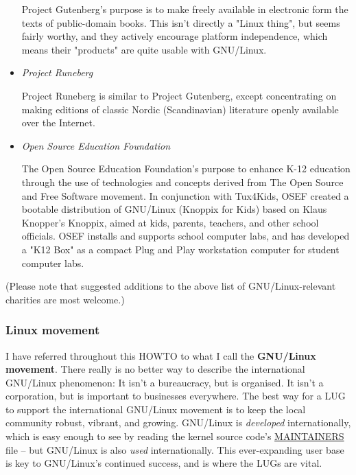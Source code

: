 \begin{itemize}
Project Gutenberg's purpose is to make freely available in electronic
form the texts of public-domain books.  This isn't directly a "Linux
thing", but seems fairly worthy, and they actively encourage platform
independence, which means their "products" are quite usable with GNU/Linux.



\item  
\emph{Project Runeberg} \texttt{\adsurl}
 
Project Runeberg is similar to Project Gutenberg, except concentrating
on making editions of classic Nordic (Scandinavian) literature openly
available over the Internet.





\item  
\emph{Open Source Education Foundation} \texttt{\adturl}
 
The Open Source Education Foundation's purpose to enhance K-12 education
through the use of technologies and concepts derived from The Open
Source and Free Software movement.  In conjunction with Tux4Kids, OSEF 
created a bootable distribution of GNU/Linux (Knoppix for Kids) based 
on Klaus Knopper's Knoppix, aimed at kids, parents, teachers, and 
other school officials. OSEF installs and supports school computer labs, 
and has developed a "K12 Box" as a compact Plug and Play workstation 
computer for student computer labs.



\end{itemize}


(Please note that suggested additions to the above list of GNU/Linux-relevant 
charities are most welcome.)






\subsubsection{Linux movement}

I have referred throughout this HOWTO to what I call the {\bfseries GNU/Linux
movement}. There really is no better way to describe the
international GNU/Linux phenomenon: It isn't a bureaucracy, but is
organised. It isn't a corporation, but is important to businesses
everywhere. The best way for a LUG to support the international GNU/Linux
movement is to keep the local community robust, vibrant, and
growing. GNU/Linux is {\itshape developed\/} internationally, which is easy
enough to see by reading the kernel source code's 
\url{MAINTAINERS} file -- but
GNU/Linux is also {\itshape used\/} internationally.  This ever-expanding
user base is key to GNU/Linux's continued success, and is where the LUGs
are vital.

